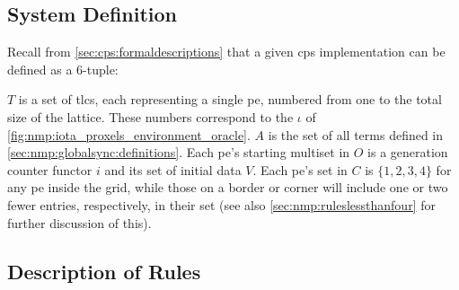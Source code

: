 \subsection{System Definition}
Recall from \cref{sec:cps:formaldescriptions} that a given \gls{cps} implementation can be defined as a 6-tuple:


\(T\) is a set of \glspl{tlc}, each representing a single \gls{pe}, numbered from one to the total size of the lattice.  These numbers correspond to the \(\iota\) of \cref{fig:nmp:iota_proxels_environment_oracle}.  \(A\) is the set of all terms defined in \cref{sec:nmp:globalsync:definitions}.  Each \gls{pe}'s starting multiset in \(O\) is a generation counter \gls{functor} \(i\) and its set of initial data \(V\).  Each \gls{pe}'s set in \(C\) is \(\{1, 2, 3, 4\}\) for any \gls{pe} inside the grid, while those on a border or corner will include one or two fewer entries, respectively, in their set (see also \cref{sec:nmp:ruleslessthanfour} for further discussion of this).

\subsection{\label{sec:nmp:globalsync:rulesdesc}Description of Rules}

